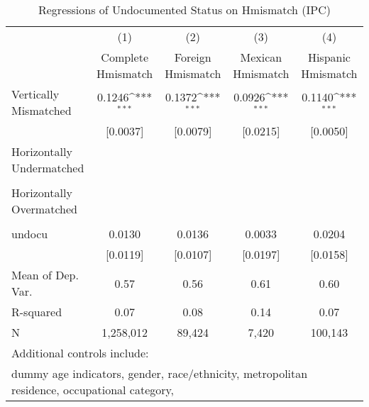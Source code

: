 \begin{table}[htbp]\centering
\def\sym#1{\ifmmode^{#1}\else\(^{#1}\)\fi}
\caption{Regressions of Undocumented Status on Hmismatch (IPC)}
\begin{tabular}{l*{4}{c}}
\toprule
                    &\multicolumn{1}{c}{(1)}         &\multicolumn{1}{c}{(2)}         &\multicolumn{1}{c}{(3)}         &\multicolumn{1}{c}{(4)}         \\
                    &Complete Hmismatch         &Foreign Hmismatch         &Mexican Hmismatch         &Hispanic Hmismatch         \\
\midrule
Vertically Mismatched&      0.1246\sym{***}&      0.1372\sym{***}&      0.0926\sym{***}&      0.1140\sym{***}\\
                    &    [0.0037]         &    [0.0079]         &    [0.0215]         &    [0.0050]         \\
\addlinespace
Horizontally Undermatched&                     &                     &                     &                     \\
                    &                     &                     &                     &                     \\
\addlinespace
Horizontally Overmatched&                     &                     &                     &                     \\
                    &                     &                     &                     &                     \\
\addlinespace
undocu              &      0.0130         &      0.0136         &      0.0033         &      0.0204         \\
                    &    [0.0119]         &    [0.0107]         &    [0.0197]         &    [0.0158]         \\
\midrule
Mean of Dep. Var.   &        0.57         &        0.56         &        0.61         &        0.60         \\
R-squared           &        0.07         &        0.08         &        0.14         &        0.07         \\
N                   &   1,258,012         &      89,424         &       7,420         &     100,143         \\
\bottomrule
\multicolumn{5}{l}{\footnotesize Additional controls include:}\\
\multicolumn{5}{l}{\footnotesize dummy age indicators, gender, race/ethnicity, metropolitan residence, occupational category,}\\

\end{tabular}
\end{table}
